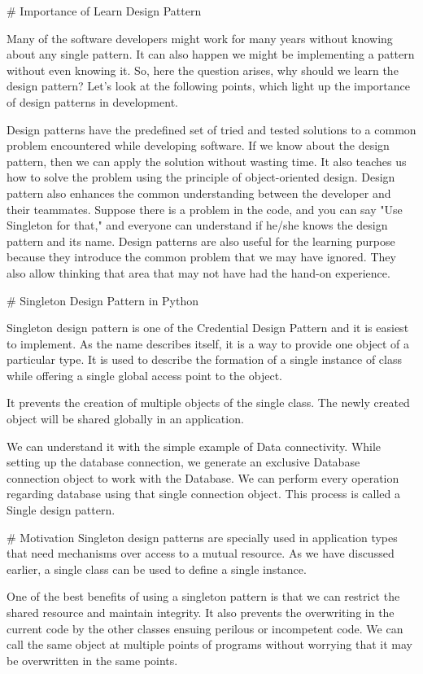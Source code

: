 # Importance of Learn Design Pattern

Many of the software developers might work for many years without knowing about any single pattern. It can also happen we might be implementing a pattern without even knowing it. So, here the question arises, why should we learn the design pattern? Let's look at the following points, which light up the importance of design patterns in development.

Design patterns have the predefined set of tried and tested solutions to a common problem encountered while developing software. If we know about the design pattern, then we can apply the solution without wasting time. It also teaches us how to solve the problem using the principle of object-oriented design.
Design pattern also enhances the common understanding between the developer and their teammates. Suppose there is a problem in the code, and you can say "Use Singleton for that," and everyone can understand if he/she knows the design pattern and its name.
Design patterns are also useful for the learning purpose because they introduce the common problem that we may have ignored. They also allow thinking that area that may not have had the hand-on experience.


# Singleton Design Pattern in Python

Singleton design pattern is one of the Credential Design Pattern and it is easiest to implement. As the name describes itself, it is a way to provide one object of a particular type. It is used to describe the formation of a single instance of class while offering a single global access point to the object.

It prevents the creation of multiple objects of the single class. The newly created object will be shared globally in an application.

We can understand it with the simple example of Data connectivity. While setting up the database connection, we generate an exclusive Database connection object to work with the Database. We can perform every operation regarding database using that single connection object. This process is called a Single design pattern.


# Motivation
Singleton design patterns are specially used in application types that need mechanisms over access to a mutual resource. As we have discussed earlier, a single class can be used to define a single instance.


One of the best benefits of using a singleton pattern is that we can restrict the shared resource and maintain integrity. It also prevents the overwriting in the current code by the other classes ensuing perilous or incompetent code. We can call the same object at multiple points of programs without worrying that it may be overwritten in the same points.



